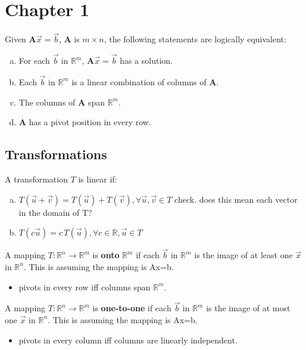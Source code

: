 \documentclass[11pt]{article}
\newcommand{\R}{\mathbb{R}}
\newcommand{\A}{\mathbf{A}}
\begin{document}
\maketitle

\section{Chapter 1}

 Given $\A\vec{x} = \vec{b}$, $\A$ is $m \times n$, the following statements are logically equivalent: 
\begin{enumerate} [a)]
  \item For each $\vec{b}$ in $\R^m$, $\A \vec{x} = \vec{b}$ has a solution.
  \item Each $\vec{b}$ in $\R^m$ is a linear combination of columns of $\mathbf{A}$.
  \item The columns of $\A$ span $\R^m$.
  \item $\A$ has a pivot position in every row.
\end{enumerate}

\subsection{Transformations}

\noindent {} A transformation $T$ is linear if:
\begin{enumerate} [a)]
  \item $T(\vec{u} + \vec{v}) = T(\vec{u}) + T(\vec{v}), \forall \vec{u}, \vec{v} \in T$  
  check. does this mean each vector in the domain of T?
  \item $T(c \vec{u}) = c \, T(\vec{u}), \forall c \in \R, \vec{u} \in T$
\end{enumerate}

\noindent {} A mapping $T:\R^n \rightarrow \R^m$ is \textbf{onto} $\R^m$ if each 
$\vec{b}$ in $\R^m$ is the image of at least one $\vec{x}$ in $\R^n$.
This is assuming the mapping is Ax=b.
\begin{itemize}
  \item pivots in every row iff columns span $\R^m$.
\end{itemize}

\noindent {} A mapping $T:\R^n \rightarrow \R^m$ is \textbf{one-to-one} if each 
$\vec{b}$ in $\R^m$ is the image of at most one $\vec{x}$ in $\R^n$.
This is assuming the mapping is Ax=b.
\begin{itemize}
  \item pivots in every column iff columns are linearly independent.
\end{itemize}
\end{document}
